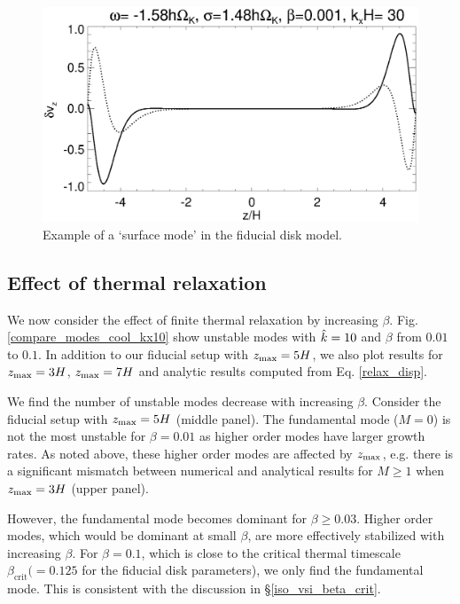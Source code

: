 \begin{figure}
  \includegraphics[width=\linewidth,clip=true,trim=0cm 0cm 0cm
  0cm]{figures/eigenvectorvz_iso_surf}
  \caption{Example of a `surface mode' in the fiducial disk model.
    \label{lowfreq_eigenfunc_surf}
  }
\end{figure}

\subsection{Effect of thermal relaxation}\label{therm_relax_eff}
We now consider the effect of finite thermal relaxation by increasing 
$\beta$. %
Fig. \ref{compare_modes_cool_kx10} show unstable modes with $\hat{k}=10$ 
and $\beta$ from $0.01$ to  $0.1$. In addition to our fiducial setup with 
$z_\mathrm{max}=5H$, we also plot results for $z_\mathrm{max}=3H$, $z_\mathrm{max}=7H$ and 
analytic results computed from Eq. \ref{relax_disp}.  %

We find the number of unstable modes decrease with increasing
$\beta$. Consider the fiducial setup with $z_\mathrm{max}=5H$ 
(middle panel). The fundamental mode ($M=0$) is not the most unstable for   
$\beta=0.01$ as higher order modes have larger
growth rates. As noted above, these higher order modes are affected by
$z_\mathrm{max}$, e.g. there is a significant mismatch between numerical and 
analytical results for $M\geq1$ when $z_\mathrm{max}=3H$ (upper panel). 


However, the fundamental mode becomes dominant for $\beta \geq 
0.03$. Higher order modes, which would be dominant at small $\beta$, 
are more effectively stabilized with increasing $\beta$. For 
$\beta=0.1$, which is close to the critical thermal timescale
$\beta_\mathrm{crit} (=0.125$ for the fiducial disk
parameters), we only find the fundamental mode. This is consistent with
the discussion in \S\ref{iso_vsi_beta_crit}.    

